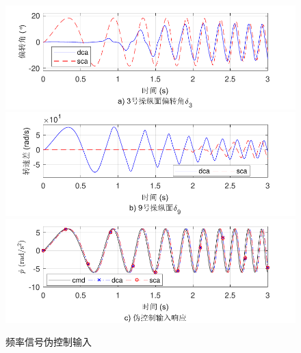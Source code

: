 \begin{figure}[htbp]
	\centering	
	\includegraphics[scale=1]{Fig/TDF_chirps_response_a.pdf}
	\includegraphics[scale=1]{Fig/TDF_chirps_response_b.pdf}
	\includegraphics[scale=1]{Fig/TDF_chirps_response_c.pdf}
	\caption{\label{chirps}频率信号伪控制输入}
\end{figure}

